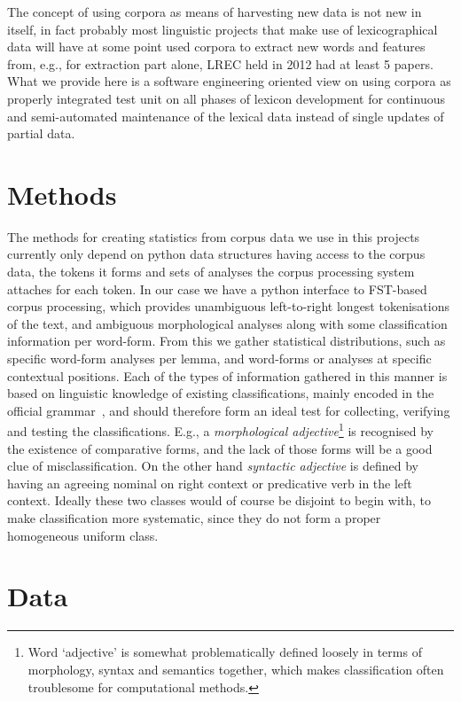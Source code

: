 \documentclass[a5paper]{article}
\begin{document}
The concept of using corpora as means of harvesting new data is not new in
itself, in fact probably most linguistic projects that make use of
lexicographical data will have at some point used corpora to extract new words
and features from, e.g., for extraction part alone, LREC held in 2012 had at
least 5 papers. What we provide here is a software engineering oriented view on
using corpora as properly integrated test unit on all phases of lexicon
development for continuous and semi-automated maintenance of the lexical data
instead of single updates of partial data.

\section{Methods}

The methods for creating statistics from corpus data we use in this projects
currently only depend on python data structures having access to the corpus
data, the tokens it forms and sets of analyses the corpus processing system
attaches for each token. In our case we have a python interface to FST-based
corpus processing, which provides unambiguous left-to-right longest
tokenisations of the text, and ambiguous morphological analyses along with some
classification information per word-form. From this we gather statistical
distributions, such as specific word-form analyses per lemma, and word-forms or
analyses at specific contextual positions. Each of the types of information
gathered in this manner is based on linguistic knowledge of existing
classifications, mainly encoded in the official grammar~\cite{visk}, and should
therefore form an ideal test for collecting, verifying and testing the
classifications. E.g., a \emph{morphological adjective}\footnote{Word
`adjective' is somewhat problematically defined loosely in terms of morphology,
syntax and semantics together, which makes classification often troublesome for
computational methods.} is recognised by the existence of comparative forms,
and the lack of those forms will be a good clue of misclassification. On the
other hand \emph{syntactic adjective} is defined by having an agreeing nominal
on right context or predicative verb in the left context. Ideally these two
classes would of course be disjoint to begin with, to make classification more
systematic, since they do not form a proper homogeneous uniform class.

\section{Data}
\end{document}
